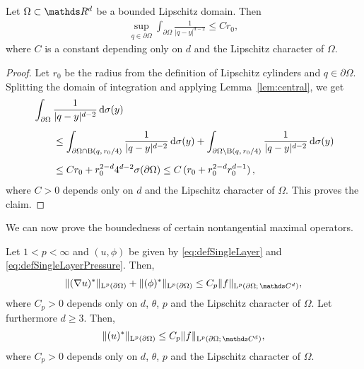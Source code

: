 \begin{lem}
  \label{lem:youngApp}
  Let $\Omega \subset \R^d$ be a bounded Lipschitz domain. Then
  \begin{align*}
    \sup_{q \in \partial\Omega} \int_{\partial\Omega} \frac{1}{|q - y|^{d - 2}} \leq C r_0,
  \end{align*}
  where $C$ is a constant depending only on $d$ and the Lipschitz character of $\Omega$.
\end{lem}

\begin{proof}
  Let $r_0$ be the radius from the definition of Lipschitz cylinders and $q \in \partial\Omega$.
  Splitting the domain of integration and applying Lemma~\ref{lem:central}, we get
  \begin{align*}
    &\int_{\partial\Omega} \frac{1}{|q - y|^{d - 2}} \, {\operatorname{d}\!{\sigma}}(y) \\[0.5em]
    &\qquad \leq \int_{\partial\Omega \cap \mathrm{B}(q,\, r_0/4)} \frac{1}{|q - y|^{d - 2}} \, {\operatorname{d}\!{\sigma}}(y) 
    + \int_{\partial\Omega \setminus \mathrm{B}(q,\, r_0/4)} \frac{1}{|q - y|^{d - 2}} \, {\operatorname{d}\!{\sigma}}(y) \\[0.5em]
    &\qquad\leq C r_0 + r_0^{2 - d} 4^{d - 2} \sigma(\partial\Omega)
    \leq C\, ( r_0 + r_0^{2 - d} r_0^{d - 1})\,,
  \end{align*}
  where $C > 0$ depends only on $d$ and the Lipschitz character of $\Omega$.
  This proves the claim.
\end{proof}

We can now prove the boundedness of certain nontangential maximal operators.
\begin{lem}
  \label{lem:nontangentialMaximalFunctions}
  Let $1 < p < \infty$ and $(u,\phi)$ be given by \eqref{eq:defSingleLayer} and \eqref{eq:defSingleLayerPressure}.
  Then,
  \begin{align}
    \| (\nabla u)^* \|_{\Ell^p(\partial\Omega)}  +  \| (\phi)^* \|_{\Ell^p(\partial\Omega)} \leq C_p \|f\|_{\Ell^p(\partial\Omega; \,\C^d)},
  \end{align}
  where $C_p > 0$ depends only on $d$, $\theta$, $p$ and the Lipschitz character of $\Omega$.
  Let furthermore $d \geq 3$. Then,
  \begin{align}
    \label{eq:estimateUstar}
     \|(u)^*\|_{\Ell^p(\partial\Omega)} \leq C_p \|f\|_{\Ell^p(\partial\Omega;\, \C^d)},
  \end{align}
  where $C_p > 0$ depends only on $d$, $\theta$, $p$ and the Lipschitz character of $\Omega$.
\end{lem}

